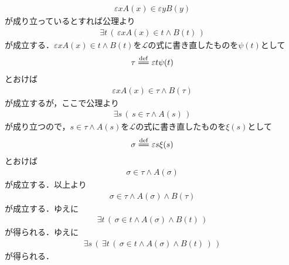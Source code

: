\documentclass[a4j,10.5pt,oneside,openany]{jsbook}
\theoremstyle{mystyle}
\newcommand{\defeq}{\overset{\mathrm{def}}{=\joinrel=}} %
\begin{document}
\begin{itemize}
\begin{align}
				\varepsilon x A(x) \in \varepsilon y B(y)
			\end{align}
			が成り立っているとすれば公理より
			\begin{align}
				\exists t\, \left(\, \varepsilon x A(x) \in t \wedge B(t)\, \right)
			\end{align}
			が成立する．$\varepsilon x A(x) \in t \wedge B(t)$を$\mathcal{L}$の式に書き直したものを$\psi(t)$として
			\begin{align}
				\tau \defeq \varepsilon t \psi(t)
			\end{align}
			とおけば
			\begin{align}
				\varepsilon x A(x) \in \tau \wedge B(\tau)
			\end{align}
			が成立するが，ここで公理より
			\begin{align}
				\exists s\, \left(\, s \in \tau \wedge A(s)\, \right)
			\end{align}
			が成り立つので，$s \in \tau \wedge A(s)$を$\mathcal{L}$の式に書き直したものを$\xi(s)$として
			\begin{align}
				\sigma \defeq \varepsilon s \xi(s)
			\end{align}
			とおけば
			\begin{align}
				\sigma \in \tau \wedge A(\sigma)
			\end{align}
			が成立する．以上より
			\begin{align}
				\sigma \in \tau \wedge A(\sigma) \wedge B(\tau)
			\end{align}
			が成立する．ゆえに
			\begin{align}
				\exists t\, \left(\, \sigma \in t \wedge A(\sigma) \wedge B(t)\, \right)
			\end{align}
			が得られる．ゆえに
			\begin{align}
				\exists s\, \left(\, \exists t\, \left(\, \sigma \in t \wedge A(\sigma) \wedge B(t)\, \right)\, \right)
			\end{align}
			が得られる．
	\end{itemize}
\end{document}
